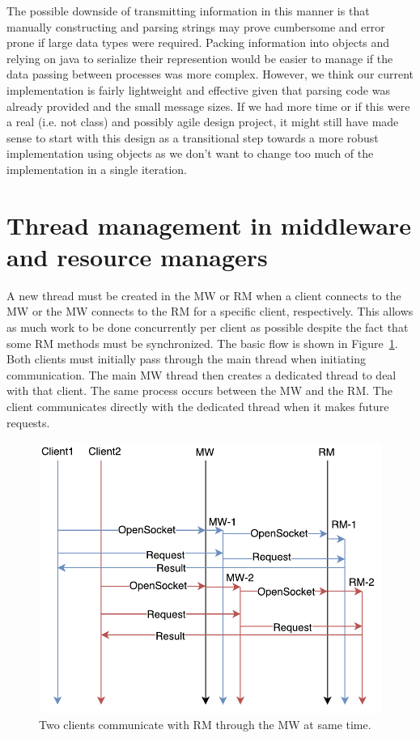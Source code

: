 \documentclass{article}
\begin{document}
The possible downside of transmitting information in this manner is that manually constructing and parsing strings may prove cumbersome and error prone if large data types were required. 
Packing information into objects and relying on java to serialize their represention would be easier to manage if the data passing between processes was more complex. 
However, we think our current implementation is fairly lightweight and effective given that parsing code was already provided and the small message sizes. 
If we had more time or if this were a real (i.e. not class) and possibly agile design project, it might still have made sense to start with this design as a transitional step towards a more robust implementation using objects as we don't want to change too much of the implementation in a single iteration. 
 
 



\section{Thread management in middleware and resource managers}

A new thread must be created in the MW or RM when a client connects to the MW or the MW connects to the RM for a specific client, respectively. This allows as much work to be done concurrently per client as possible despite the fact that some RM methods must be synchronized. The basic flow is shown in Figure~\ref{f:threads}. Both clients must initially pass through the main thread when initiating communication. The main MW thread then creates a dedicated thread to deal with that client. The same process occurs between the MW and the RM. The client communicates directly with the dedicated thread when it makes future requests.

\begin{figure}
\centering
\includegraphics[scale=1]{figures/threads.pdf}
\caption{Two clients communicate with RM through the MW at same time.}
\label{f:threads}
\end{figure} 
\end{document}
